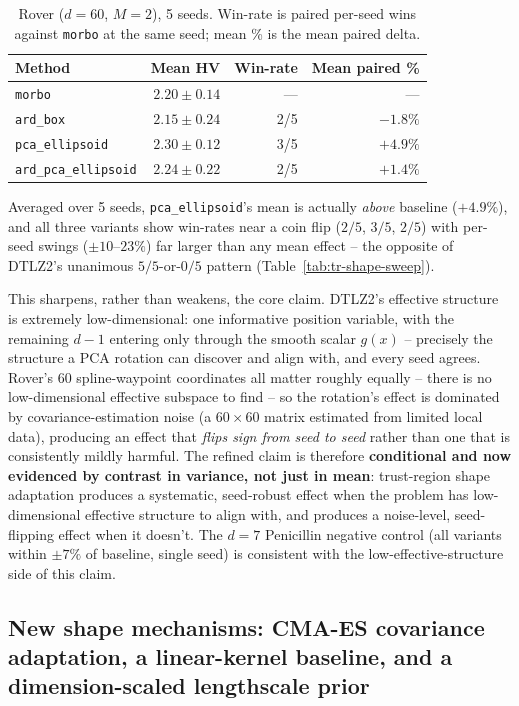 \documentclass[11pt]{article}
\begin{document}
\begin{table}[h]
\centering
\caption{Rover ($d=60$, $M=2$), 5 seeds. Win-rate is paired per-seed wins
against \texttt{morbo} at the same seed; mean \% is the mean paired delta.}
\label{tab:tr-shape-rover}
\begin{tabular}{lrrr}
\toprule
Method & Mean HV & Win-rate & Mean paired \% \\
\midrule
\texttt{morbo} & $2.20\pm0.14$ & --- & --- \\
\texttt{ard\_box} & $2.15\pm0.24$ & 2/5 & $-1.8\%$ \\
\texttt{pca\_ellipsoid} & $2.30\pm0.12$ & 3/5 & $\mathbf{+4.9\%}$ \\
\texttt{ard\_pca\_ellipsoid} & $2.24\pm0.22$ & 2/5 & $+1.4\%$ \\
\bottomrule
\end{tabular}
\end{table}

Averaged over 5 seeds, \texttt{pca\_ellipsoid}'s mean is actually
\emph{above} baseline ($+4.9\%$), and all three variants show win-rates
near a coin flip ($2/5$, $3/5$, $2/5$) with per-seed swings ($\pm10$--$23\%$)
far larger than any mean effect -- the opposite of DTLZ2's unanimous
$5/5$-or-$0/5$ pattern (Table~\ref{tab:tr-shape-sweep}).

This sharpens, rather than weakens, the core claim. DTLZ2's effective
structure is extremely low-dimensional: one informative position variable,
with the remaining $d-1$ entering only through the smooth scalar $g(x)$ --
precisely the structure a PCA rotation can discover and align with, and
every seed agrees. Rover's 60 spline-waypoint coordinates all matter
roughly equally -- there is no low-dimensional effective subspace to find
-- so the rotation's effect is dominated by covariance-estimation noise (a
$60\times60$ matrix estimated from limited local data), producing an effect
that \emph{flips sign from seed to seed} rather than one that is
consistently mildly harmful. The refined claim is therefore
\textbf{conditional and now evidenced by contrast in variance, not just in
mean}: trust-region shape adaptation produces a systematic, seed-robust
effect when the problem has low-dimensional effective structure to align
with, and produces a noise-level, seed-flipping effect when it doesn't. The
$d=7$ Penicillin negative control (all variants within $\pm7\%$ of
baseline, single seed) is consistent with the low-effective-structure side
of this claim.

\subsection{New shape mechanisms: CMA-ES covariance adaptation, a linear-kernel baseline, and a dimension-scaled lengthscale prior}
\end{document}
